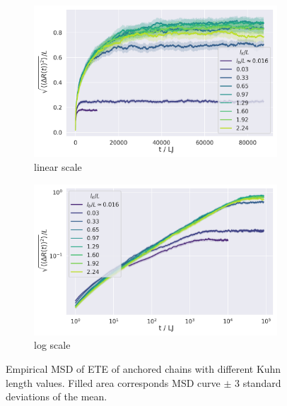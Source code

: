\documentclass[
    paper=A4,pagesize=automedia,fontsize=12pt,
    BCOR=15mm,DIV=22,
    twoside,headinclude,footinclude=false,
    fleqn,             %
    bibliography=totocnumbered,          %
    listof=totoc,                %
    listof=flat,                 %
    cleardoublepage=empty      %
    numbers=endperiod
]{scrartcl}
\begin{document}
\begin{figure}
    \centering
    \begin{subfigure}[b]{\textwidth}
        \centering
        \includegraphics[width=\columnwidth,trim={0cm 0cm 0cm 0.0cm},clip]{4-exp-delta_R-bare.png}
        \caption{\label{fig:msd_anchored_l_K_normal}
        linear scale
        }
    \end{subfigure}
    \begin{subfigure}[b]{\textwidth}
        \centering
        \includegraphics[width=\columnwidth,trim={0cm 0cm 0cm 0.0cm},clip]{4-exp-delta_R-bare-log.png}
        \caption{\label{fig:msd_anchored_l_K_log}
        log scale
        }
    \end{subfigure}
    \caption{Empirical MSD of ETE of anchored chains with different Kuhn length values.
    Filled area corresponds MSD curve $\pm$ 3 standard deviations of the mean.}
    \label{fig:msd_anchored_l_K}
\end{figure}
\end{document}
